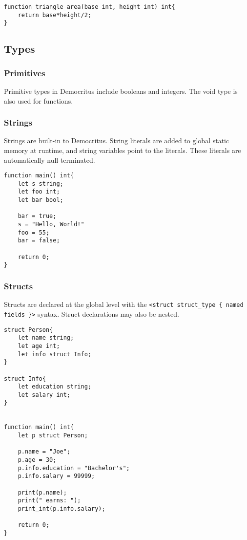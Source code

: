 	\begin{lstlisting}
function triangle_area(base int, height int) int{
	return base*height/2;
}
	\end{lstlisting}

	\subsection{Types}

		\subsubsection{Primitives}
		Primitive types in Democritus include booleans and integers. The void type is also used for functions.

		\subsubsection{Strings}
		Strings are built-in to Democritus. String literals are added to global static memory at runtime, and string variables point to the literals. These literals are automatically null-terminated.

		\begin{lstlisting}
function main() int{
	let s string;
	let foo int;
	let bar bool;

	bar = true;
	s = "Hello, World!"
	foo = 55;
	bar = false;

	return 0;
}
		\end{lstlisting}


	 	\subsubsection{Structs}
	 	Structs are declared at the global level with the \verb|<struct struct_type { named fields }>| syntax. Struct declarations may also be nested.

	 	\begin{lstlisting}
struct Person{
	let name string;
	let age int;
	let info struct Info;
}

struct Info{
	let education string;
	let salary int;
}


function main() int{
	let p struct Person;

	p.name = "Joe";
	p.age = 30;
	p.info.education = "Bachelor's";
	p.info.salary = 99999;

	print(p.name);
	print(" earns: ");
	print_int(p.info.salary);

	return 0;
}
	 	\end{lstlisting}


